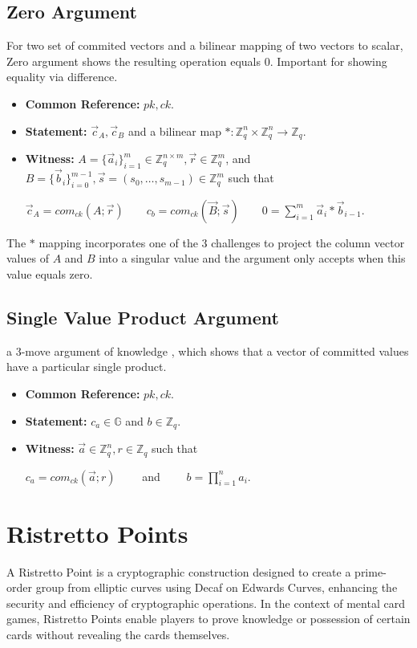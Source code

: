 \documentclass[12pt,a4paper]{report}
\begin{document}
\subsection*{Zero Argument} For two set of commited vectors and a bilinear mapping of two vectors to scalar, Zero argument shows the resulting operation equals $0$. 
Important for showing equality via difference.
\begin{itemize}
	\item \textbf{Common Reference:} $pk, ck$.
	\item \textbf{Statement:} $\vec{c}_A, \vec{c}_B$ and a bilinear map $*: \mathbb{Z}_q^n \times \mathbb{Z}_q^n \rightarrow \mathbb{Z}_q$.
	\item \textbf{Witness:} $A = \{\vec{a}_i\}_{i=1}^m \in \mathbb{Z}^{n \times m}_q, \vec{r} \in \mathbb{Z}_q^m$, and $B = \{\vec{b}_i\}_{i=0}^{m-1}, \vec{s} = (s_0,\ldots,s_{m-1}) \in \mathbb{Z}_q^m$ such that
		\begin{center}
			$\displaystyle \vec{c}_A = com_{ck}(A; \vec{r}) \qquad c_b = com_{ck}(\vec{B}; \vec{s}) \qquad 0 = \sum_{i=1}^m \vec{a}_i * \vec{b}_{i-1}$.
		\end{center}
\end{itemize}
The $*$ mapping incorporates one of the 3 challenges to project the column vector values of $A$ and $B$ into a singular value and the argument only accepts when this value equals zero.
\subsection*{Single Value Product Argument} a 3-move argument of knowledge \cite{gro10}, which shows that a vector of committed values have a particular single product.
\begin{itemize}
	\item \textbf{Common Reference:} $pk, ck$.
	\item \textbf{Statement:} $c_a \in \mathbb{G}$ and $b \in \mathbb{Z}_q$.
	\item \textbf{Witness:} $\vec{a} \in \mathbb{Z}_q^n, r \in \mathbb{Z}_q$ such that
		\begin{center}
			$c_a = com_{ck}(\vec{a};r) \qquad$ and $\displaystyle \qquad b = \prod_{i=1}^n a_i$.
		\end{center}
\end{itemize}

\section{Ristretto Points}
A Ristretto Point is a cryptographic construction designed to create a
prime-order group from elliptic curves using Decaf\cite{decaf} on Edwards Curves, 
enhancing the security and efficiency of cryptographic operations. 
In the context of mental card games, Ristretto Points 
enable players to prove knowledge or 
possession of certain cards without revealing the cards themselves.
\end{document}
